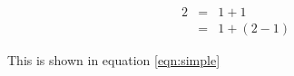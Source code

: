 \begin{eqnarray}
	2 &=& 1+1 \\
	  &=& 1+(2-1) \label{eqn:simple}
\end{eqnarray}

This is shown in equation \ref{eqn:simple}
